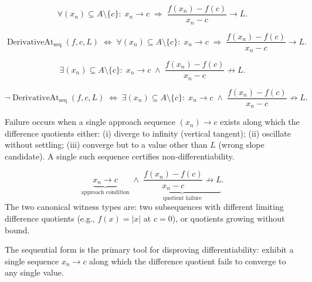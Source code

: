 \begin{remark*}
\[
\forall (x_n) \subseteq A \setminus \{c\}:\;
x_n \to c \;\Rightarrow\; \frac{f(x_n)-f(c)}{x_n-c} \to L.
\]
\end{remark*}

\begin{remark*}
\[
\operatorname{DerivativeAt}_{\mathrm{seq}}(f,c,L)
\;\Longleftrightarrow\;
\forall (x_n)\subseteq A\setminus\{c\}:\;
x_n\to c \;\Rightarrow\; \frac{f(x_n)-f(c)}{x_n-c}\to L.
\]
\end{remark*}

\begin{remark*}
\[
\exists (x_n) \subseteq A \setminus \{c\}:\;
x_n \to c \;\land\; \frac{f(x_n)-f(c)}{x_n-c} \not\to L.
\]
\end{remark*}

\begin{remark*}
\[
\neg\operatorname{DerivativeAt}_{\mathrm{seq}}(f,c,L)
\;\Longleftrightarrow\;
\exists (x_n)\subseteq A\setminus\{c\}:\;
x_n\to c \;\land\; \frac{f(x_n)-f(c)}{x_n-c}\not\to L.
\]
\end{remark*}

\begin{remark*}
Failure occurs when a single approach sequence $(x_n) \to c$ exists along which the difference quotients either: (i) diverge to infinity (vertical tangent); (ii) oscillate without settling; (iii) converge but to a value other than $L$ (wrong slope candidate). A single such sequence certifies non-differentiability.
\end{remark*}

\begin{remark*}
\[
\underbrace{x_n \to c}_{\text{approach condition}} \;\land\; \underbrace{\frac{f(x_n)-f(c)}{x_n-c} \not\to L}_{\text{quotient failure}}.
\]
The two canonical witness types are: two subsequences with different limiting difference quotients (e.g., $f(x) = |x|$ at $c = 0$), or quotients growing without bound.
\end{remark*}

\begin{remark*}[Interpretation]
The sequential form is the primary tool for disproving differentiability: exhibit a single sequence $x_n \to c$ along which the difference quotient fails to converge to any single value.
\end{remark*}

